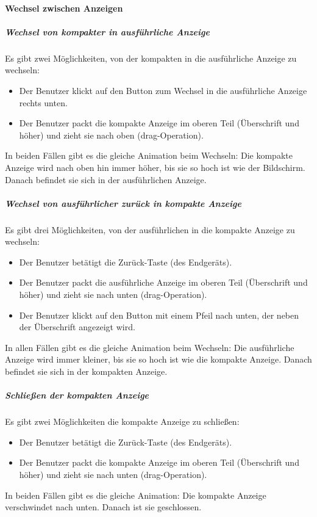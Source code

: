 \paragraph*{Wechsel zwischen Anzeigen}
\subparagraph*{Wechsel von kompakter in ausführliche Anzeige}
Es gibt zwei Möglichkeiten, von der kompakten in die ausführliche Anzeige zu wechseln:
\begin{itemize}
    \item Der Benutzer klickt auf den Button zum Wechsel in die ausführliche Anzeige rechts unten.
    \item Der Benutzer packt die kompakte Anzeige im oberen Teil (Überschrift und höher) und zieht sie nach oben (drag-Operation).
\end{itemize}
In beiden Fällen gibt es die gleiche Animation beim Wechseln: Die kompakte Anzeige wird nach oben hin immer 
höher, bis sie so hoch ist wie der Bildschirm. Danach befindet sie sich in der ausführlichen Anzeige.

\subparagraph*{Wechsel von ausführlicher zurück in kompakte Anzeige}
Es gibt drei Möglichkeiten, von der ausführlichen in die kompakte Anzeige zu wechseln:
\begin{itemize}
    \item Der Benutzer betätigt die Zurück-Taste (des Endgeräts).
    \item Der Benutzer packt die ausführliche Anzeige im oberen Teil (Überschrift und höher) und zieht sie nach unten (drag-Operation).
    \item Der Benutzer klickt auf den Button mit einem Pfeil nach unten, der neben der Überschrift angezeigt wird.
\end{itemize}
In allen Fällen gibt es die gleiche Animation beim Wechseln: Die ausführliche Anzeige wird immer 
kleiner, bis sie so hoch ist wie die kompakte Anzeige. Danach befindet sie sich in der kompakten Anzeige.

\subparagraph*{Schließen der kompakten Anzeige}
Es gibt zwei Möglichkeiten die kompakte Anzeige zu schließen:
\begin{itemize}
    \item Der Benutzer betätigt die Zurück-Taste (des Endgeräts).
    \item Der Benutzer packt die kompakte Anzeige im oberen Teil (Überschrift und höher) und zieht sie nach unten (drag-Operation). 
\end{itemize}
In beiden Fällen gibt es die gleiche Animation: Die kompakte Anzeige verschwindet nach unten. Danach ist sie geschlossen.

